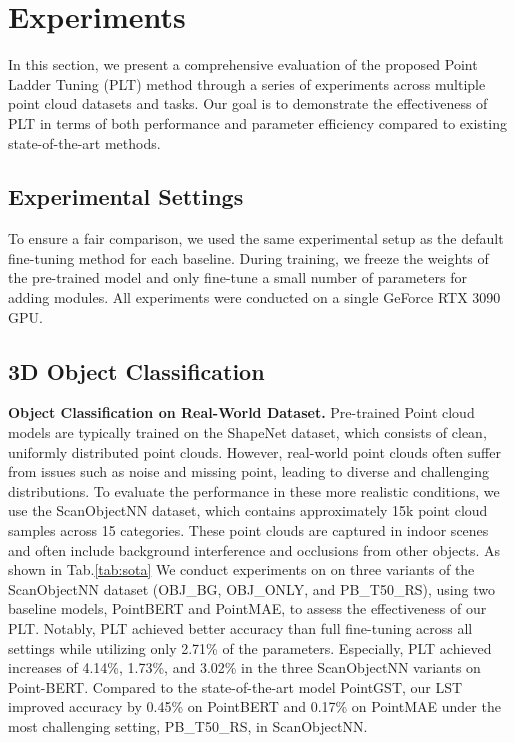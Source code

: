 \section{Experiments}
\label{sec:experiments}
In this section, we present a comprehensive evaluation of the proposed Point Ladder Tuning (PLT) method through a series of experiments across multiple point cloud datasets and tasks. Our goal is to demonstrate the effectiveness of PLT in terms of both performance and parameter efficiency compared to existing state-of-the-art methods.
\subsection{Experimental Settings}
To ensure a fair comparison, we used the same experimental setup as the default fine-tuning method\cite{zha2023instance, zhou2024dynamic} for each baseline. During training, we freeze the weights of the pre-trained model and only fine-tune a small number of parameters for adding modules. All experiments were conducted on a single GeForce RTX 3090 GPU.



\subsection{3D Object Classification}
\textbf{Object Classification on Real-World Dataset.} Pre-trained Point cloud models are typically trained on the ShapeNet dataset\cite{chang2015shapenet}, which consists of clean, uniformly distributed point clouds. However, real-world point clouds often suffer from issues such as noise and missing point, leading to diverse and challenging distributions. To evaluate the performance in these more realistic conditions, we use the ScanObjectNN dataset\cite{uy2019revisiting}, which contains approximately 15k point cloud samples across 15 categories. These point clouds are captured in indoor scenes and often include background interference and occlusions from other objects. As shown in Tab.\ref{tab:sota} We conduct experiments on on three variants of the ScanObjectNN dataset\cite{uy2019revisiting} (OBJ\_BG, OBJ\_ONLY, and PB\_T50\_RS), using two baseline models, PointBERT\cite{yu2022point} and PointMAE\cite{pang2022masked}, to assess the effectiveness of our PLT. Notably, PLT achieved better accuracy than full fine-tuning across all settings while utilizing only 2.71\% of the parameters. Especially, PLT achieved increases of 4.14\%, 1.73\%, and 3.02\% in the three ScanObjectNN\cite{uy2019revisiting} variants on Point-BERT. Compared to the state-of-the-art model PointGST, our LST improved accuracy by 0.45\% on PointBERT\cite{yu2022point} and 0.17\% on PointMAE\cite{pang2022masked} under the most challenging setting, PB\_T50\_RS, in ScanObjectNN\cite{uy2019revisiting}.

